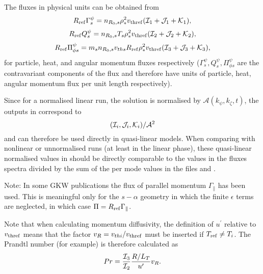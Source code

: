 The fluxes in physical units can be obtained from 
\begin{equation} 
R_{\rm ref}\Gamma^\psi_s  = n_{R_0,s} \rho_*^2 v_{\rm thref} ({\cal I}_1+{\cal J}_1+{\cal K}_1),
\end{equation} 
\begin{equation} 
R_{\rm ref}Q_s^\psi = n_{R_0,s} T_s \rho_*^2 v_{\rm thref} ({\cal I}_2+{\cal J}_2+{\cal K}_2) ,
\end{equation} 
\begin{equation} 
R_{\rm ref}\Pi^\psi_{\phi s} = m_s n_{R_0,s} v_{ths} R_{\rm ref} \rho_*^2 v_{\rm thref} ({\cal I}_3+{\cal J}_3+{\cal K}_3),
\end{equation}
for particle, heat, and angular momentum fluxes respectively ($\Gamma^\psi_s,Q_s^\psi,\Pi^\psi_{\phi s}$ are the contravariant components of the flux and therefore have units of particle, heat, angular momentum flux per unit length respectively).  

Since for a normalised linear run, the solution is normalised by $\mathcal{A}(k_\psi,k_\zeta,t)$, the outputs in  correspond to
\begin{equation}
 ( {\cal I}_i, {\cal J}_i, {\cal K}_i ) / \mathcal{A}^2
\end{equation}
and can therefore be used directly in quasi-linear models.  When comparing with nonlinear or unnormalised runs (at least in the linear phase), 
these quasi-linear normalised values in  should be directly comparable to the values in the fluxes spectra divided by 
the sum of the per mode values in the files  and .

Note:  In some GKW publications the flux of parallel momentum $\Gamma_\parallel$ has been used.  This is meaningful only for the $s-\alpha$ geometry in which the finite $\epsilon$ terms are neglected, in which case $\Pi = R_{\rm ref} \Gamma_\parallel $.

Note that when calculating momentum diffusivity,
the definition of $u^\prime$ relative to $v_{\rm thref}$ means that the factor $v_R=v_{thi}/v_{\rm thref}$ must be inserted if $T_{\rm ref} \ne T_i$. The Prandtl number (for example) is therefore calculated as
\begin{equation}
Pr = {{\cal I}_3 \over {\cal I}_2} {R/L_T \over {u^\prime}} v_R.
\end{equation}

